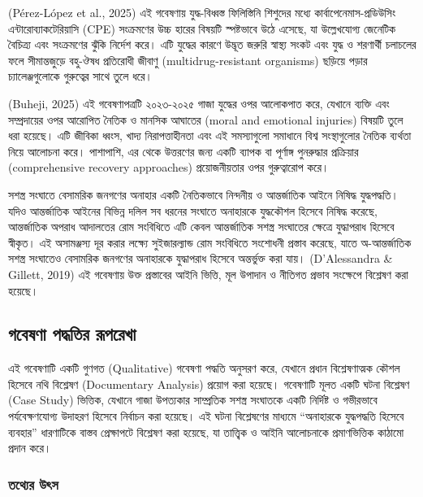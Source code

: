 (Pérez-López et al., 2025) এই গবেষণায় যুদ্ধ-বিধ্বস্ত ফিলিস্তিনি শিশুদের মধ্যে কার্বাপেনেমাস-প্রডিউসিং এন্টারোব্যাকটেরিয়াসি (CPE) সংক্রমণের উচ্চ হারের বিষয়টি স্পষ্টভাবে উঠে এসেছে, যা উল্লেখযোগ্য জেনেটিক বৈচিত্র্য এবং সংক্রমণের ঝুঁকি নির্দেশ করে। এটি যুদ্ধের কারণে উদ্ভূত জরুরি স্বাস্থ্য সংকট এবং যুদ্ধ ও শরণার্থী চলাচলের ফলে সীমান্তজুড়ে বহু-ঔষধ প্রতিরোধী জীবাণু (multidrug-resistant organisms) ছড়িয়ে পড়ার চ্যালেঞ্জগুলোকে গুরুত্বের সাথে তুলে ধরে।

(Buheji, 2025) এই গবেষণাপত্রটি ২০২৩-২০২৫ গাজা যুদ্ধের ওপর আলোকপাত করে, যেখানে ব্যক্তি এবং সম্প্রদায়ের ওপর আরোপিত নৈতিক ও মানসিক আঘাতের (moral and emotional injuries) বিষয়টি তুলে ধরা হয়েছে। এটি জীবিকা ধ্বংস, খাদ্য নিরাপত্তাহীনতা এবং এই সমস্যাগুলো সমাধানে বিশ্ব সংস্থাগুলোর নৈতিক ব্যর্থতা নিয়ে আলোচনা করে। পাশাপাশি, এর থেকে উত্তরণের জন্য একটি ব্যাপক বা পূর্ণাঙ্গ পুনরুদ্ধার প্রক্রিয়ার (comprehensive recovery approaches) প্রয়োজনীয়তার ওপর গুরুত্বারোপ করে।

সশস্ত্র সংঘাতে বেসামরিক জনগণের অনাহার একটি নৈতিকভাবে নিন্দনীয় ও আন্তর্জাতিক আইনে নিষিদ্ধ যুদ্ধপদ্ধতি। যদিও আন্তর্জাতিক আইনের বিভিন্ন দলিল সব ধরনের সংঘাতে অনাহারকে যুদ্ধকৌশল হিসেবে নিষিদ্ধ করেছে, আন্তর্জাতিক অপরাধ আদালতের রোম সংবিধিতে এটি কেবল আন্তর্জাতিক সশস্ত্র সংঘাতের ক্ষেত্রে যুদ্ধাপরাধ হিসেবে স্বীকৃত। এই অসামঞ্জস্য দূর করার লক্ষ্যে সুইজারল্যান্ড রোম সংবিধিতে সংশোধনী প্রস্তাব করেছে, যাতে অ-আন্তর্জাতিক সশস্ত্র সংঘাতেও বেসামরিক জনগণের অনাহারকে যুদ্ধাপরাধ হিসেবে অন্তর্ভুক্ত করা যায়। (D'Alessandra \& Gillett, 2019) এই গবেষণায় উক্ত প্রস্তাবের আইনি ভিত্তি, মূল উপাদান ও নীতিগত প্রভাব সংক্ষেপে বিশ্লেষণ করা হয়েছে।

\subsection{\texorpdfstring{গবেষণা পদ্ধতির রূপরেখা}{১.৭ গবেষণা পদ্ধতির রূপরেখা}}\label{ux997ux9acux9b7ux9a3-ux9aaux9a6ux9a7ux9a4ux9b0-ux9b0ux9aaux9b0ux996}

এই গবেষণাটি একটি গুণগত (Qualitative) গবেষণা পদ্ধতি অনুসরণ করে, যেখানে প্রধান বিশ্লেষণাত্মক কৌশল হিসেবে নথি বিশ্লেষণ (Documentary Analysis) প্রয়োগ করা হয়েছে। গবেষণাটি মূলত একটি ঘটনা বিশ্লেষণ (Case Study) ভিত্তিক, যেখানে গাজা উপত্যকার সাম্প্রতিক সশস্ত্র সংঘাতকে একটি নির্দিষ্ট ও গভীরভাবে পর্যবেক্ষণযোগ্য উদাহরণ হিসেবে নির্বাচন করা হয়েছে। এই ঘটনা বিশ্লেষণের মাধ্যমে ``অনাহারকে যুদ্ধপদ্ধতি হিসেবে ব্যবহার'' ধারণাটিকে বাস্তব প্রেক্ষাপটে বিশ্লেষণ করা হয়েছে, যা তাত্ত্বিক ও আইনি আলোচনাকে প্রমাণভিত্তিক কাঠামো প্রদান করে।

\subsubsection{\texorpdfstring{ তথ্যের উৎস }{১.৭.১ তথ্যের উৎস }}\label{ux9a4ux9a5ux9afux9b0-ux989ux9ceux9b8}

